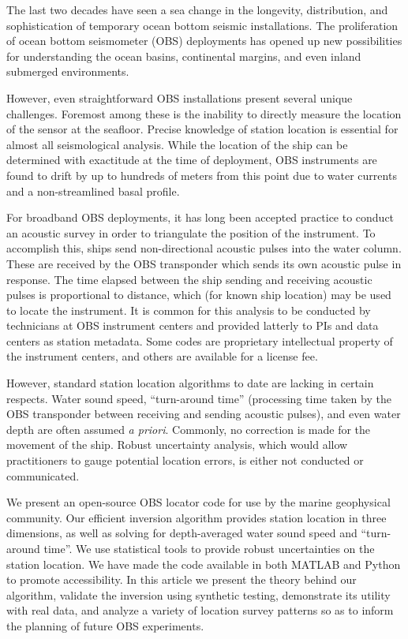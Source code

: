 The last two decades have seen a sea change in the longevity, distribution, and sophistication of temporary ocean bottom seismic installations. The proliferation of ocean bottom seismometer (OBS) deployments has opened up new possibilities for understanding the ocean basins, continental margins, and even inland submerged environments. 

However, even straightforward OBS installations present several unique challenges. Foremost among these is the inability to directly measure the location of the sensor at the seafloor. Precise knowledge of station location is essential for almost all seismological analysis. While the location of the ship can be determined with exactitude at the time of deployment, OBS instruments are found to drift by up to hundreds of meters from this point due to water currents and a non-streamlined  basal profile. 

For broadband OBS deployments, it has long been accepted practice to conduct an acoustic survey in order to triangulate the position of the instrument. To accomplish this, ships send non-directional acoustic pulses into the water column. These are received by the OBS transponder which sends its own acoustic pulse in response. The time elapsed between the ship sending and receiving acoustic pulses is proportional to distance, which (for known ship location) may be used to locate the instrument. It is common for this analysis to be conducted by technicians at OBS instrument centers and provided latterly to PIs and data centers as station metadata. Some codes are proprietary intellectual property of the instrument centers, and others are available for a license fee. 

However, standard station location algorithms to date are lacking in certain respects. Water sound speed, ``turn-around time'' (processing time taken by the OBS transponder between receiving and sending acoustic pulses), and even water depth are often assumed \textit{a priori}. Commonly, no correction is made for the movement of the ship. Robust uncertainty analysis, which would allow practitioners to gauge potential location errors, is either not conducted or communicated. 

We present an open-source OBS locator code for use by the marine geophysical community. Our efficient inversion algorithm provides station location in three dimensions, as well as solving for depth-averaged water sound speed and ``turn-around time''. We use statistical tools to provide robust uncertainties on the station location. We have made the code available in both MATLAB and Python to promote accessibility. In this article we present the theory behind our algorithm, validate the inversion using synthetic testing, demonstrate its utility with real data, and analyze a variety of location survey patterns so as to inform the planning of future OBS experiments. 